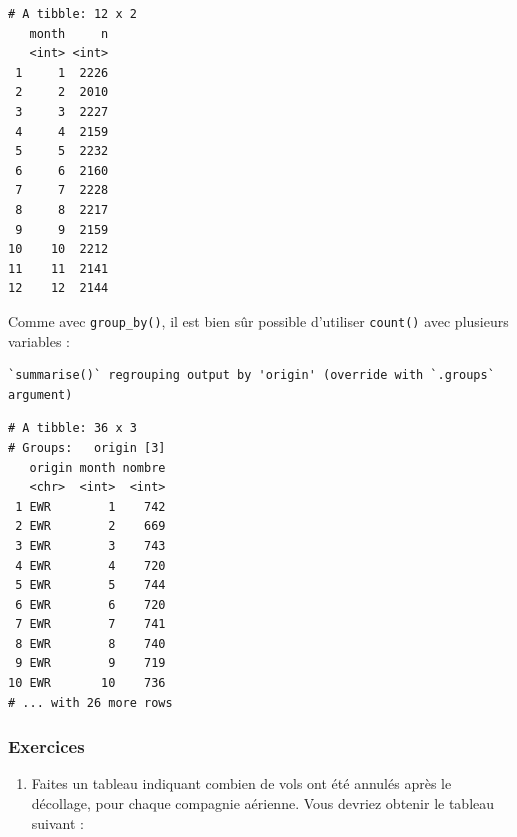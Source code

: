 \documentclass[
  a4paper,
]{article}
\newenvironment{Shaded}{\begin{snugshade}}{\end{snugshade}}
\newcommand{\DataTypeTok}[1]{\textcolor[rgb]{0.00,0.34,0.68}{#1}}
\newcommand{\KeywordTok}[1]{\textcolor[rgb]{0.12,0.11,0.11}{\textbf{#1}}}
\newcommand{\NormalTok}[1]{\textcolor[rgb]{0.12,0.11,0.11}{#1}}
\newcommand{\OperatorTok}[1]{\textcolor[rgb]{0.12,0.11,0.11}{#1}}
\newcommand{\StringTok}[1]{\textcolor[rgb]{0.75,0.01,0.01}{#1}}
\providecommand{\tightlist}{%
  \setlength{\itemsep}{0pt}\setlength{\parskip}{0pt}}
\begin{document}
\begin{Shaded}
\end{Shaded}

\begin{verbatim}
# A tibble: 12 x 2
   month     n
   <int> <int>
 1     1  2226
 2     2  2010
 3     3  2227
 4     4  2159
 5     5  2232
 6     6  2160
 7     7  2228
 8     8  2217
 9     9  2159
10    10  2212
11    11  2141
12    12  2144
\end{verbatim}

Comme avec \texttt{group\_by()}, il est bien sûr possible d'utiliser \texttt{count()} avec plusieurs variables :

\begin{Shaded}
\end{Shaded}

\begin{verbatim}
`summarise()` regrouping output by 'origin' (override with `.groups` argument)
\end{verbatim}

\begin{verbatim}
# A tibble: 36 x 3
# Groups:   origin [3]
   origin month nombre
   <chr>  <int>  <int>
 1 EWR        1    742
 2 EWR        2    669
 3 EWR        3    743
 4 EWR        4    720
 5 EWR        5    744
 6 EWR        6    720
 7 EWR        7    741
 8 EWR        8    740
 9 EWR        9    719
10 EWR       10    736
# ... with 26 more rows
\end{verbatim}

\hypertarget{exercices-9}{%
\subsubsection{Exercices}\label{exercices-9}}

\begin{enumerate}
\def\labelenumi{\arabic{enumi}.}
\tightlist
\item
  Faites un tableau indiquant combien de vols ont été annulés après le décollage, pour chaque compagnie aérienne. Vous devriez obtenir le tableau suivant :
\end{enumerate}
\end{document}
